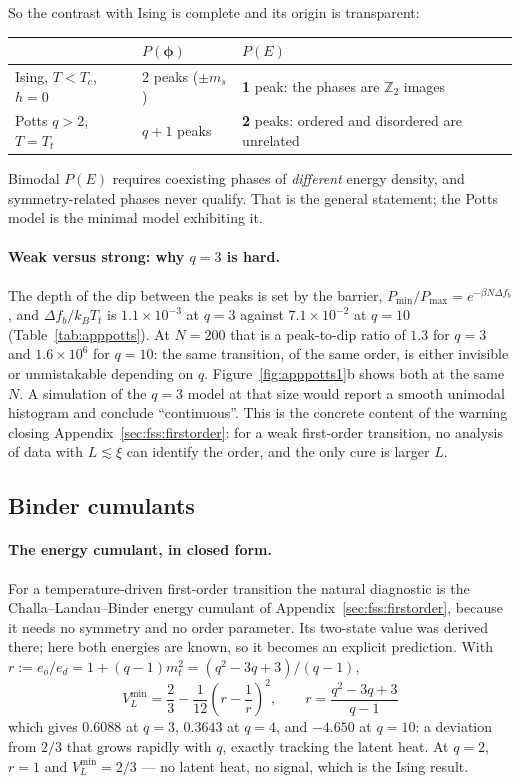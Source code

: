 \documentclass[10pt,a4paper]{article}
\theoremstyle{remark}
\begin{document}
So the contrast with Ising is complete and its origin is transparent:
\begin{center}
\renewcommand{\arraystretch}{1.2}
\begin{tabular}{@{}lll@{}}
\toprule
 & $P(\boldsymbol{\phi})$ & $P(E)$\\
\midrule
Ising, $T<T_c$, $h=0$ & $2$ peaks ($\pm m_s$) & \textbf{1} peak: the phases are
$\mathbb{Z}_2$ images\\
Potts $q>2$, $T=T_t$ & $q{+}1$ peaks & \textbf{2} peaks: ordered and disordered
are unrelated\\
\bottomrule
\end{tabular}
\end{center}
Bimodal $P(E)$ requires coexisting phases of \emph{different} energy density, and
symmetry-related phases never qualify. That is the general statement; the Potts
model is the minimal model exhibiting it.

\paragraph{Weak versus strong: why $q=3$ is hard.} The depth of the dip between
the peaks is set by the barrier, $P_{\min}/P_{\max}=e^{-\beta N\Delta f_b}$, and
$\Delta f_b/k_BT_t$ is $1.1\times10^{-3}$ at $q=3$ against
$7.1\times10^{-2}$ at $q=10$ (Table~\ref{tab:apppotts}). At $N=200$ that is a
peak-to-dip ratio of $1.3$ for $q=3$ and $1.6\times10^{6}$ for $q=10$: the same
transition, of the same order, is either invisible or unmistakable depending on
$q$. Figure~\ref{fig:apppotts1}b shows both at the same $N$. A simulation of the
$q=3$ model at that size would report a smooth unimodal histogram and conclude
``continuous''. This is the concrete content of the warning closing
Appendix~\ref{sec:fss:firstorder}: for a weak first-order transition, no analysis of
data with $L\lesssim\xi$ can identify the order, and the only cure is larger $L$.

\subsection{Binder cumulants}
\label{sec:apppotts:binder}

\paragraph{The energy cumulant, in closed form.} For a temperature-driven
first-order transition the natural diagnostic is the Challa--Landau--Binder energy
cumulant of Appendix~\ref{sec:fss:firstorder}, because it needs no symmetry and no
order parameter. Its two-state value was derived there; here both energies are
known, so it becomes an explicit prediction. With
$r:= e_o/e_d=1+(q-1)m_t^{2}=(q^{2}-3q+3)/(q-1)$,
\[
\;
V_L^{\min}=\frac{2}{3}-\frac{1}{12}\left(r-\frac1r\right)^{2},
\qquad r=\frac{q^{2}-3q+3}{q-1}\
\]
which gives $0.6088$ at $q=3$, $0.3643$ at $q=4$, and $-4.650$ at $q=10$: a
deviation from $2/3$ that grows rapidly with $q$, exactly tracking the latent
heat. At $q=2$, $r=1$ and $V_L^{\min}=2/3$ --- no latent heat, no signal, which is
the Ising result.
\end{document}
